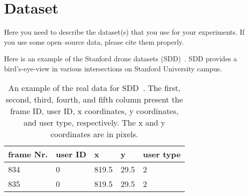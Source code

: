 \chapter{Dataset}
\label{cp:dataset}

Here you need to describe the dataset(s) that you use for your experiments. If you use some open--source data, please cite them properly.

Here is an example of the Stanford drone datasets (SDD)~\cite{robicquet2016learning}. \ac{SDD} provides a bird's-eye-view in various intersections on Stanford University campus. 

\begin{table}[h!]
\begin{centering}
\begin{tabular}{ | m{2cm} | m{2cm} | m{2cm} | m{2cm} | m{2cm} |} 
\hline
frame Nr. & user ID & x  & y  & user type \\ 
\hline
834 & 0 & 819.5 & 29.5 & 2 \\
\hline
835 & 0 & 819.5 & 29.5 & 2 \\
\hline
\end{tabular}
\caption[Real data of \ac{SDD}]{An example of the real data for \ac{SDD}~\cite{robicquet2016learning}. The first, second, third, fourth, and fifth column present the frame ID, user ID, x coordinates, y coordinates, and user type, respectively. The x and y coordinates are in pixels.} 
\label{table:real_data_sdd}
\end{centering}
\end{table}